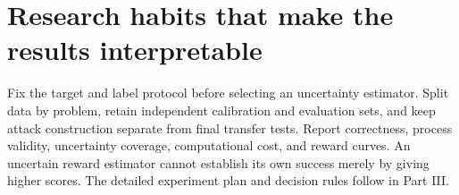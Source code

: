 \section{Research habits that make the results interpretable}
Fix the target and label protocol before selecting an uncertainty estimator.
Split data by problem, retain independent calibration and evaluation sets, and
keep attack construction separate from final transfer tests. Report correctness,
process validity, uncertainty coverage, computational cost, and reward curves.
An uncertain reward estimator cannot establish its own success merely by giving
higher scores. The detailed experiment plan and decision rules follow in Part III.
